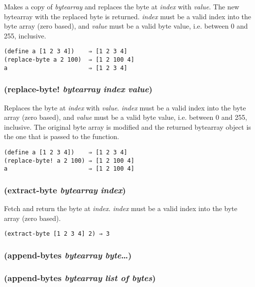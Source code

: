 \documentclass{article}
\begin{document}
Makes a copy of \emph{bytearray} and replaces the byte at \emph{index} with \emph{value}. The
new bytearray with the replaced byte is returned. \emph{index} must be a valid index into the
byte array (zero based), and \emph{value} must be a valid byte value, i.e. between 0 and 255,
inclusive.

\begin{verbatim}
(define a [1 2 3 4])    ⇒ [1 2 3 4]
(replace-byte a 2 100)  ⇒ [1 2 100 4]
a                       ⇒ [1 2 3 4]
\end{verbatim}

\subsubsection{(replace-byte! \emph{bytearray} \emph{index} \emph{value})}

Replaces the byte at \emph{index} with \emph{value}. \emph{index} must be a valid index into
the byte array (zero based), and \emph{value} must be a valid byte value, i.e. between 0 and
255, inclusive. The original byte array is modified and the returned bytearray object is the
one that is passed to the function.

\begin{verbatim}
(define a [1 2 3 4])    ⇒ [1 2 3 4]
(replace-byte! a 2 100) ⇒ [1 2 100 4]
a                       ⇒ [1 2 100 4]
\end{verbatim}

\subsubsection{(extract-byte \emph{bytearray} \emph{index})}

Fetch and return the byte at \emph{index}. \emph{index} must be a valid index into the byte
array (zero based).

\begin{verbatim}
(extract-byte [1 2 3 4] 2) ⇒ 3
\end{verbatim}

\subsubsection{(append-bytes \emph{bytearray} \emph{byte}\ldots{})}

\subsubsection{(append-bytes \emph{bytearray} \emph{list of bytes})}
\end{document}
